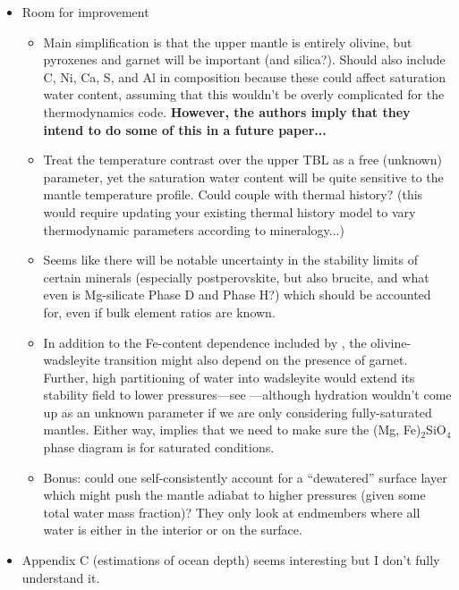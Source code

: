 \documentclass{article}
\begin{document}
\begin{itemize}
\item Room for improvement
\begin{itemize}
\item Main simplification is that the upper mantle is entirely olivine, but pyroxenes and garnet will be important (and silica?). Should also include C, Ni, Ca, S, and Al in composition because these could affect saturation water content, assuming that this wouldn't be overly complicated for the thermodynamics code. \textbf{However, the authors imply that they intend to do some of this in a future paper...}
\item Treat the temperature contrast over the upper TBL as a free (unknown) parameter, yet the saturation water content will be quite sensitive to the mantle temperature profile. Could couple with thermal history? (this would require updating your existing thermal history model to vary thermodynamic parameters according to mineralogy...)
\item Seems like there will be notable uncertainty in the stability limits of certain minerals (especially postperovskite, but also brucite, and what even is Mg-silicate Phase D and Phase H?) which should be accounted for, even if bulk element ratios are known.
\item In addition to the Fe-content dependence included by \citet{shahInternalWaterStorage2021}, the olivine-wadsleyite transition might also depend on the presence of garnet. Further, high partitioning of water into wadsleyite would extend its stability field to lower pressures---see \citet{bolfan-casanovaWaterEarthMantle2005}---although hydration wouldn't come up as an unknown parameter if we are only considering fully-saturated mantles. Either way, implies that we need to make sure the (Mg, Fe)$_2$SiO$_4$ phase diagram is for saturated conditions.
\item Bonus: could one self-consistently account for a ``dewatered'' surface layer which might push the mantle adiabat to higher pressures (given some total water mass fraction)? They only look at endmembers where all water is either in the interior or on the surface.
\end{itemize}



\item Appendix C (estimations of ocean depth) seems interesting but I don't fully understand it.
\end{itemize}
\end{document}
